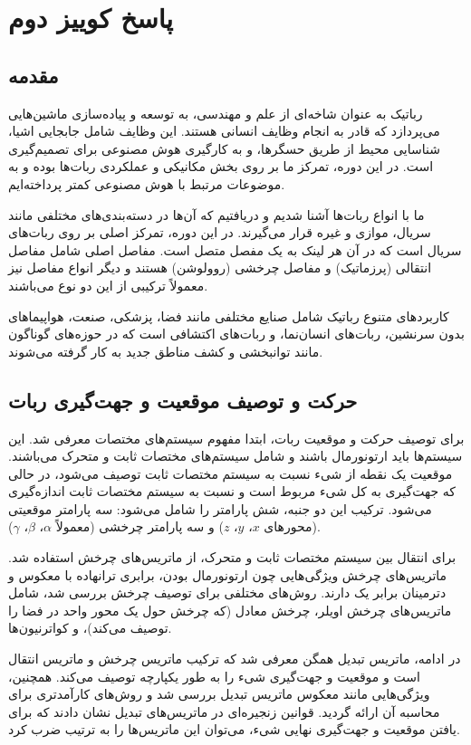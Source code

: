 
\chapter*{پاسخ کوییز دوم}

\section*{مقدمه}
رباتیک به عنوان شاخه‌ای از علم و مهندسی، به توسعه و پیاده‌سازی ماشین‌هایی می‌پردازد که قادر به انجام وظایف انسانی هستند. این وظایف شامل جابجایی اشیا، شناسایی محیط از طریق حسگرها، و به کارگیری هوش مصنوعی برای تصمیم‌گیری است. در این دوره، تمرکز ما بر روی بخش مکانیکی و عملکردی ربات‌ها بوده و به موضوعات مرتبط با هوش مصنوعی کمتر پرداخته‌ایم.

ما با انواع ربات‌ها آشنا شدیم و دریافتیم که آن‌ها در دسته‌بندی‌های مختلفی مانند سریال، موازی و غیره قرار می‌گیرند. در این دوره، تمرکز اصلی بر روی ربات‌های سریال است که در آن هر لینک به یک مفصل متصل است. مفاصل اصلی شامل مفاصل انتقالی (پرزماتیک) و مفاصل چرخشی (روولوشن) هستند و دیگر انواع مفاصل نیز معمولاً ترکیبی از این دو نوع می‌باشند.

کاربردهای متنوع رباتیک شامل صنایع مختلفی مانند فضا، پزشکی، صنعت، هواپیماهای بدون سرنشین، ربات‌های انسان‌نما، و ربات‌های اکتشافی است که در حوزه‌های گوناگون مانند توانبخشی و کشف مناطق جدید به کار گرفته می‌شوند.

\section*{حرکت و توصیف موقعیت و جهت‌گیری ربات}
برای توصیف حرکت و موقعیت ربات، ابتدا مفهوم سیستم‌های مختصات معرفی شد. این سیستم‌ها باید ارتونورمال باشند و شامل سیستم‌های مختصات ثابت و متحرک می‌باشند. موقعیت یک نقطه از شیء نسبت به سیستم مختصات ثابت توصیف می‌شود، در حالی که جهت‌گیری به کل شیء مربوط است و نسبت به سیستم مختصات ثابت اندازه‌گیری می‌شود. ترکیب این دو جنبه، شش پارامتر را شامل می‌شود: سه پارامتر موقعیتی (محورهای $x$، $y$، $z$) و سه پارامتر چرخشی (معمولاً $\alpha$، $\beta$، $\gamma$). 

برای انتقال بین سیستم مختصات ثابت و متحرک، از ماتریس‌های چرخش استفاده شد. ماتریس‌های چرخش ویژگی‌هایی چون ارتونورمال بودن، برابری ترانهاده با معکوس و دترمینان برابر یک دارند. روش‌های مختلفی برای توصیف چرخش بررسی شد، شامل ماتریس‌های چرخش اویلر، چرخش معادل (که چرخش حول یک محور واحد در فضا را توصیف می‌کند)، و کواترنیون‌ها.

در ادامه، ماتریس تبدیل همگن معرفی شد که ترکیب ماتریس چرخش و ماتریس انتقال است و موقعیت و جهت‌گیری شیء را به طور یکپارچه توصیف می‌کند. همچنین، ویژگی‌هایی مانند معکوس ماتریس تبدیل بررسی شد و روش‌های کارآمدتری برای محاسبه آن ارائه گردید. قوانین زنجیره‌ای در ماتریس‌های تبدیل نشان دادند که برای یافتن موقعیت و جهت‌گیری نهایی شیء، می‌توان این ماتریس‌ها را به ترتیب ضرب کرد.

